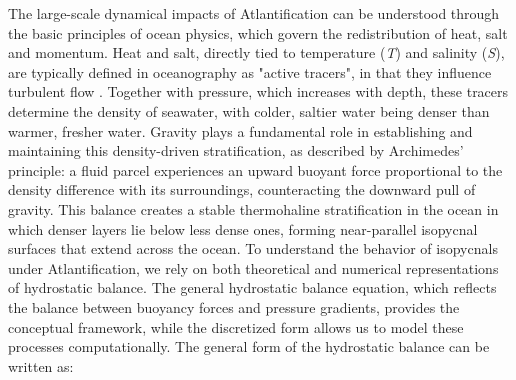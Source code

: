 \documentclass[draft]{agujournal2019}
\begin{document}




The large-scale dynamical impacts of Atlantification can be understood through the basic principles of ocean physics, which govern the redistribution of heat, salt and momentum. Heat and salt, directly tied to temperature (\emph{T}) and salinity (\emph{S}), are typically defined in oceanography as "active tracers", in that they influence turbulent flow \cite{Vallis2006}. Together with pressure, which increases with depth, these tracers determine the density of seawater, with colder, saltier water being denser than warmer, fresher water. Gravity plays a fundamental role in establishing and maintaining this density-driven stratification, as described by Archimedes' principle: a fluid parcel experiences an upward buoyant force proportional to the density difference with its surroundings, counteracting the downward pull of gravity. This balance creates a stable thermohaline stratification in the ocean in which denser layers lie below less dense ones, forming near-parallel isopycnal surfaces that extend across the ocean. To understand the behavior of isopycnals under Atlantification, we rely on both theoretical and numerical representations of hydrostatic balance. The general hydrostatic balance equation, which reflects the balance between buoyancy forces and pressure gradients, provides the conceptual framework, while the discretized form allows us to model these processes computationally. The general form of the hydrostatic balance can be written as:
\end{document}
